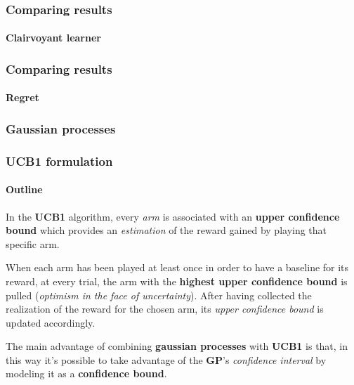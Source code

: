 \documentclass[11pt]{beamer}
\begin{document}

\begin{frame}

\frametitle{Comparing results}
\framesubtitle{Clairvoyant learner}


\end{frame}


\begin{frame}

\frametitle{Comparing results}
\framesubtitle{Regret}


\end{frame}


\begin{frame}

\frametitle{Gaussian processes}


\end{frame}


\begin{frame}

\frametitle{UCB1 formulation}
\framesubtitle{Outline}

In the \textbf{UCB1} algorithm, every \textit{arm} is associated with an \textbf{upper confidence bound} which provides an \textit{estimation} of the reward gained by playing that specific arm.

When each arm has been played at least once in order to have a baseline for its reward, at every trial, the arm with the \textbf{highest upper confidence bound} is pulled (\textit{optimism in the face of uncertainty}).
After having collected the realization of the reward for the chosen arm, its \textit{upper confidence bound} is updated accordingly.

The main advantage of combining \textbf{gaussian processes} with \textbf{UCB1} is that, in this way it's possible to take advantage of the \textbf{GP}'s \textit{confidence interval} by modeling it as a \textbf{confidence bound}.

\end{frame}
\end{document}

